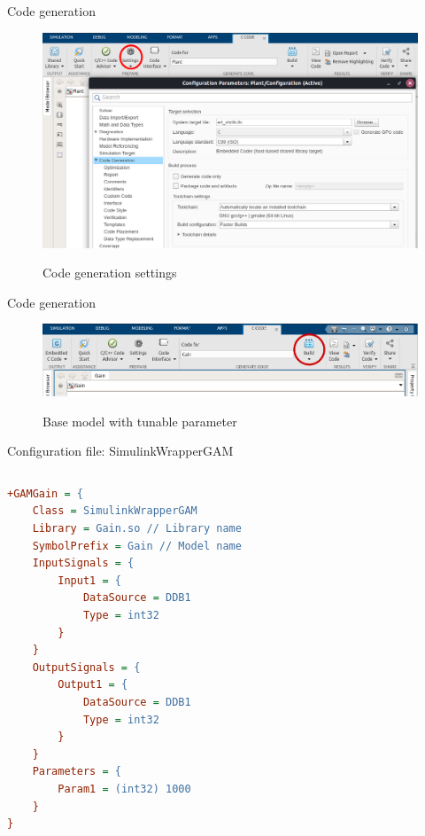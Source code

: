\begin{frame}{Code generation}
	\begin{figure}
		\centering
		\includegraphics[scale=0.3]{Settings.png}
		\label{fig:settingd}
		\caption{Code generation settings}
	\end{figure}
\end{frame}

\begin{frame}{Code generation}
	\begin{figure}
		\centering
		\includegraphics[width=\textwidth]{Build.png}
		\label{fig:build}
		\caption{Base model with tunable parameter}
	\end{figure}
\end{frame}

\begin{frame}[fragile]{Configuration file: SimulinkWrapperGAM}
	\begin{columns}
		\begin{lstlisting}[style=small, language = cfg]
+GAMGain = {
    Class = SimulinkWrapperGAM
    Library = Gain.so // Library name
    SymbolPrefix = Gain // Model name
    InputSignals = {
        Input1 = {
            DataSource = DDB1
            Type = int32
        }
    }
    OutputSignals = {
        Output1 = {
            DataSource = DDB1
            Type = int32
        }
    }
    Parameters = {
        Param1 = (int32) 1000
    }
}\end{lstlisting}
	\end{columns}
\end{frame}

